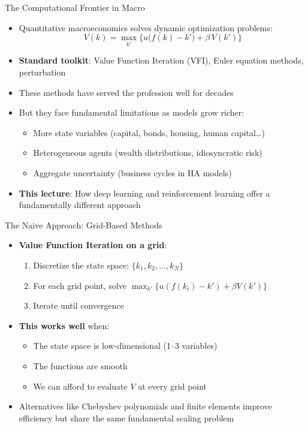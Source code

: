 \documentclass[10pt,english,aspectratio=169]{beamer}
\begin{document}
\begin{frame}{The Computational Frontier in Macro}
\begin{itemize}
  \item Quantitative macroeconomics solves dynamic optimization problems:
    \[
      V(k) = \max_{k'} \Big\{ u\big(f(k) - k'\big) + \beta\, V(k') \Big\}
    \]
  \item \textbf{Standard toolkit}: Value Function Iteration (VFI), Euler equation methods, perturbation
  \medskip
  \item These methods have served the profession well for decades
  \item But they face fundamental limitations as models grow richer:
    \begin{itemize}
      \item More state variables (capital, bonds, housing, human capital\ldots)
      \item Heterogeneous agents (wealth distributions, idiosyncratic risk)
      \item Aggregate uncertainty (business cycles in HA models)
    \end{itemize}
  \medskip
  \item \textbf{This lecture}: How deep learning and reinforcement learning offer a fundamentally different approach
\end{itemize}
\end{frame}

\begin{frame}{The Naive Approach: Grid-Based Methods}
\begin{itemize}
  \item \textbf{Value Function Iteration on a grid}:
    \begin{enumerate}
      \item Discretize the state space: $\{k_1, k_2, \ldots, k_N\}$
      \item For each grid point, solve $\max_{k'} \{u(f(k_i) - k') + \beta V(k')\}$
      \item Iterate until convergence
    \end{enumerate}
  \medskip
  \item \textbf{This works well} when:
    \begin{itemize}
      \item The state space is low-dimensional (1--3 variables)
      \item The functions are smooth
      \item We can afford to evaluate $V$ at every grid point
    \end{itemize}
  \medskip
  \item Alternatives like Chebyshev polynomials and finite elements improve efficiency but share the same fundamental scaling problem
\end{itemize}
\end{frame}
\end{document}
